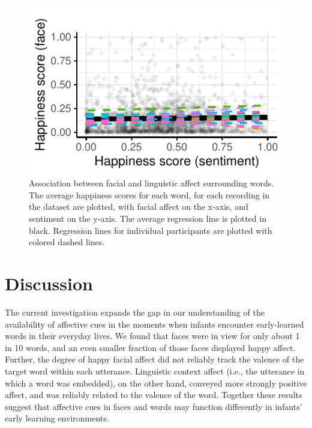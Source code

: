 \documentclass[10pt, letterpaper]{article}
\begin{document}
\begin{CodeChunk}
\begin{figure}[H]

{\centering \includegraphics{figs/figure3-1} 

}

\caption[Association between facial and linguistic affect surrounding words]{Association between facial and linguistic affect surrounding words. The average happiness scores for each word, for each recording in the dataset are plotted, with facial affect on the x-axis, and sentiment on the y-axis. The average regression line is plotted in black. Regression lines for individual participants are plotted with colored dashed lines. }\label{fig:figure3}
\end{figure}
\end{CodeChunk}

\section{Discussion}\label{discussion}

The current investigation expands the gap in our understanding of the
availability of affective cues in the moments when infants encounter
early-learned words in their everyday lives. We found that faces were in
view for only about 1 in 10 words, and an even smaller fraction of those
faces displayed happy affect. Further, the degree of happy facial affect
did not reliably track the valence of the target word within each
utterance. Linguistic context affect (i.e., the utterance in which a
word was embedded), on the other hand, conveyed more strongly positive
affect, and was reliably related to the valence of the word. Together
these results suggest that affective cues in faces and words may
function differently in infants' early learning environments.
\end{document}
